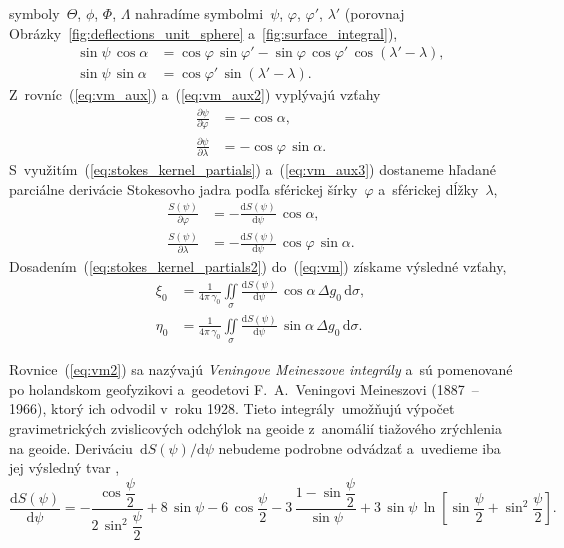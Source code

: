 \documentclass[a4paper, 12pt]{book}
\newcommand{\diff}{\mathrm d}
\begin{document}
symboly~$\Theta$, $\phi$, $\Phi$, $\Lambda$ nahradíme symbolmi~$\psi$, 
$\varphi$, $\varphi'$, $\lambda'$ (porovnaj 
Obrázky~\ref{fig:deflections_unit_sphere} a~\ref{fig:surface_integral}),
%
\begin{equation}
\label{eq:vm_aux2}
\begin{split}
\sin\psi \, \cos\alpha &= \cos\varphi \, \sin\varphi' - \sin\varphi \, 
\cos\varphi' \, \cos(\lambda' - \lambda){,}\\
\sin\psi \, \sin\alpha &= \cos\varphi' \, \sin(\lambda' - \lambda){.}
\end{split}
\end{equation}
%
Z~rovníc~(\ref{eq:vm_aux}) a~(\ref{eq:vm_aux2}) vyplývajú vzťahy
%
\begin{equation}
\label{eq:vm_aux3}
\begin{split}
\frac{\partial\psi}{\partial\varphi} &= -\cos\alpha{,}\\
%
\frac{\partial\psi}{\partial\lambda} &= -\cos\varphi \, \sin\alpha{.}
\end{split}
\end{equation}
%
S~využitím~(\ref{eq:stokes_kernel_partials}) a~(\ref{eq:vm_aux3}) dostaneme 
hľadané parciálne derivácie Stokesovho jadra podľa sférickej šírky~$\varphi$ 
a~sférickej dĺžky~$\lambda$,
%
\begin{equation}
\label{eq:stokes_kernel_partials2}
\begin{split}
\frac{S(\psi)}{\partial\varphi} &= -\frac{\diff S(\psi)}{\diff \psi} \, 
\cos\alpha{,}\\
%
\frac{S(\psi)}{\partial\lambda} &= -\frac{\diff S(\psi)}{\diff \psi} \, 
\cos\varphi \, \sin\alpha{.}
\end{split}
\end{equation}
%
Dosadením~(\ref{eq:stokes_kernel_partials2}) do~(\ref{eq:vm}) získame výsledné 
vzťahy,
    \begin{equation}
\label{eq:vm2}
\begin{split}
\xi_0 &= \frac{1}{4\pi\,\gamma_0} \iint\limits_\sigma \frac{\diff 
S(\psi)}{\diff \psi} \, \cos\alpha \, \Delta g_0 \, \diff\sigma{,}\\
\eta_0 &= \frac{1}{4\pi\,\gamma_0} \iint\limits_\sigma \frac{\diff 
S(\psi)}{\diff \psi} \, \sin\alpha \, \Delta g_0 \, \diff\sigma{.}
\end{split}
\end{equation}

Rovnice~(\ref{eq:vm2}) sa nazývajú \emph{Veningove Meineszove integrály} a~sú 
pomenované po holandskom geofyzikovi a~geodetovi F.~A.~Veningovi Meineszovi 
(1887~-- 1966), ktorý ich odvodil v~roku 1928.  Tieto integrály~umožňujú 
výpočet gravimetrických zvislicových odchýlok na geoide z~anomálií tiažového 
zrýchlenia na geoide.  Deriváciu~$\diff S(\psi) \slash \diff\psi$ nebudeme 
podrobne odvádzať a~uvedieme iba jej výsledný tvar
\parencite{MoritzPhysicalGeodesy},
%
\begin{equation}
\frac{\diff S(\psi)}{\diff \psi} = - \frac{\cos\dfrac{\psi}{2}}{2 \, 
\sin^2\dfrac{\psi}{2}} + 8 \, \sin\psi - 6 \, \cos\dfrac{\psi}{2} - 3\, \frac{1 
- \sin\dfrac{\psi}{2}}{\sin\psi} + 3 \, \sin\psi \, \ln \left[ 
\sin\dfrac{\psi}{2} + \sin^2\dfrac{\psi}{2} \right]{.}
\end{equation}
\end{document}
